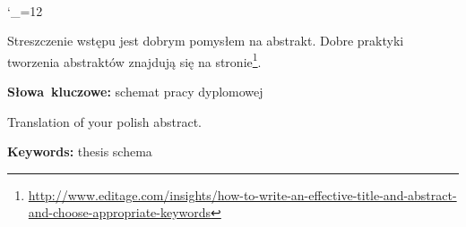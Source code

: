 \documentclass[12pt,a4paper,leqno,oneside,titlepage]{book}
\newenvironment{abstractpage}
  {\cleardoublepage\vspace*{\fill}\thispagestyle{empty}}
  {\vfill\cleardoublepage}
\newenvironment{abstract}[1]
  {\bigskip\selectlanguage{#1}%
   \begin{center}\bfseries\abstractname\end{center}}
  {\par\bigskip}
\begin{document}
\vspace{12cm} \hspace{1cm}\phantom{.}\\
\phantom{.}\hspace{5cm}{Składam serdeczne podziękowania}\\
\phantom{.}\hspace{5cm}{doktorowi }\\
\phantom{.}\hspace{5cm}{Michałowi Renowi }\\
\phantom{.}\hspace{5cm}{za jego nieocenioną pomoc }\\
\phantom{.}\hspace{5cm}{przy pisaniu tej pracy.}\\
\phantom{.}\hspace{5cm}{}\\
\phantom{.}\hspace{5cm}{Dziękuję również}\\
\phantom{.}\hspace{5cm}{Marcinowi Hancowi za szablon i }\\
\phantom{.}\hspace{5cm}{za owocną, naukową współpracę}\\
\phantom{.}\hspace{5cm}{przy tworzeniu wyników z tej pracy.}\\

\newpage
\frontmatter
\pagestyle{plain}
{
    \catcode`\_=12
    \tableofcontents
}
\listoffigures
\listoftables
\begingroup
\let\clearpage\relax
\lstlistoflistings
\endgroup

\begin{abstractpage}
\begin{abstract}{polish}
Streszczenie wstępu jest dobrym pomysłem na abstrakt. Dobre praktyki tworzenia abstraktów znajdują się na stronie\footnote{
\url{http://www.editage.com/insights/how-to-write-an-effective-title-and-abstract-and-choose-appropriate-keywords}}.
\end{abstract}
\smallskip
\noindent \textbf{Słowa~kluczowe:} schemat pracy dyplomowej

\begin{abstract}{english}
Translation of your polish abstract.
\end{abstract}
\smallskip
\noindent \textbf{Keywords:} thesis schema
\end{abstractpage}
\end{document}
